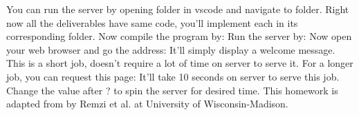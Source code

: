 {}\markdownRendererInterblockSeparator
{}You can run the server by opening folder in vscode and navigate to  folder. Right now all the deliverables have same code, you'll implement each in its corresponding folder. Now compile the program by:\markdownRendererInterblockSeparator
{}\markdownRendererInterblockSeparator
{}Run the server by:\markdownRendererInterblockSeparator
{}\markdownRendererInterblockSeparator
{}Now open your web browser and go the address:\markdownRendererInterblockSeparator
{}\markdownRendererInterblockSeparator
{}It'll simply display a welcome message. This is a short job, doesn't require a lot of time on server to serve it. For a longer job, you can request this page:\markdownRendererInterblockSeparator
{}\markdownRendererInterblockSeparator
{}It'll take 10 seconds on server to serve this job. Change the value after ? to spin the server for desired time.\markdownRendererInterblockSeparator
{}\markdownRendererInterblockSeparator
{}This homework is adapted from  by Remzi et al. at University of Wisconsin-Madison.\markdownRendererDocumentEnd